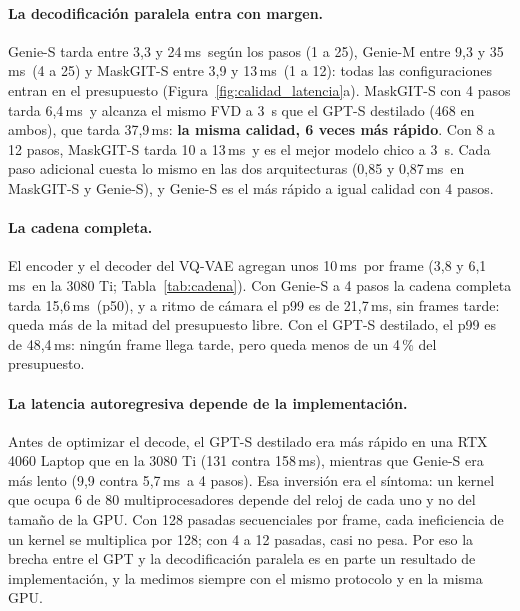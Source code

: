 \documentclass[10pt,twocolumn,a4paper]{article}
\DeclareRobustCommand{\editado}[1]{\textcolor{editado}{#1}}
\DeclareRobustCommand{\editado}[1]{#1}
\newcommand{\ms}{\,ms}
\begin{document}
\paragraph{\editado{La decodificación paralela entra con margen.}} \editado{Genie-S tarda entre 3,3 y 24\ms\ según los pasos (1 a 25), Genie-M entre 9,3 y 35\ms\ (4 a 25) y MaskGIT-S entre 3,9 y 13\ms\ (1 a 12): todas las configuraciones entran en el presupuesto (Figura~\ref{fig:calidad_latencia}a). MaskGIT-S con 4 pasos tarda 6,4\ms\ y alcanza el mismo FVD a 3~s que el GPT-S destilado (468 en ambos), que tarda 37,9\ms: \textbf{la misma calidad, 6 veces más rápido}. Con 8 a 12 pasos, MaskGIT-S tarda 10 a 13\ms\ y es el mejor modelo chico a 3~s. Cada paso adicional cuesta lo mismo en las dos arquitecturas (0,85 y 0,87\ms\ en MaskGIT-S y Genie-S), y Genie-S es el más rápido a igual calidad con 4 pasos.}

\paragraph{La cadena completa.} El encoder y el decoder del VQ-VAE agregan unos 10\ms\ por frame (3,8 y 6,1\ms\ en la 3080 Ti; Tabla~\ref{tab:cadena}). Con Genie-S a 4 pasos la cadena completa tarda 15,6\ms\ (p50), y a ritmo de cámara el p99 es de 21,7\ms, sin frames tarde: queda más de la mitad del presupuesto libre. \editado{Con el GPT-S destilado, el p99 es de 48,4\ms: ningún frame llega tarde, pero queda menos de un 4\,\% del presupuesto.}

\paragraph{\editado{La latencia autoregresiva depende de la implementación.}} \editado{Antes de optimizar el decode, el GPT-S destilado era más rápido en una RTX 4060 Laptop que en la 3080 Ti (131 contra 158\ms), mientras que Genie-S era más lento (9,9 contra 5,7\ms\ a 4 pasos). Esa inversión era el síntoma: un kernel que ocupa 6 de 80 multiprocesadores depende del reloj de cada uno y no del tamaño de la GPU. Con 128 pasadas secuenciales por frame, cada ineficiencia de un kernel se multiplica por 128; con 4 a 12 pasadas, casi no pesa. Por eso la brecha entre el GPT y la decodificación paralela es en parte un resultado de implementación, y la medimos siempre con el mismo protocolo y en la misma GPU.}

\begin{table}[t]
\centering
\small
\resizebox{\columnwidth}{!}{}
\caption{Cadena completa en la RTX 3080 Ti: p50 por etapa con la cadena cerrada, y p99 y porcentaje de frames tarde a ritmo de cámara (3000 frames).}
\label{tab:cadena}
\end{table}
\end{document}
